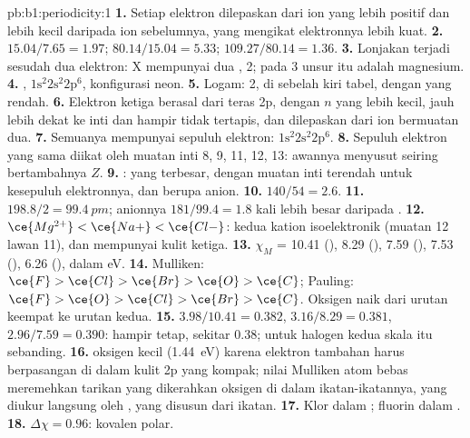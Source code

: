 \begin{solution}{pb:b1:periodicity:1}
\textbf{1.} Setiap elektron dilepaskan dari ion yang lebih positif dan
lebih kecil daripada ion sebelumnya, yang mengikat elektronnya lebih kuat.
\textbf{2.} $15.04/7.65 = 1.97$; $80.14/15.04 = 5.33$; $109.27/80.14 = 1.36$.
\textbf{3.} Lonjakan terjadi sesudah dua elektron: X mempunyai dua
,  2; pada  3 unsur itu adalah magnesium.
\textbf{4.} , $1\text{s}^2 2\text{s}^2 2\text{p}^6$,
konfigurasi neon.
\textbf{5.} Logam:  2, di sebelah kiri tabel, dengan  yang rendah.
\textbf{6.} Elektron ketiga berasal dari teras 2p, dengan $n$ yang lebih
kecil, jauh lebih dekat ke inti dan hampir tidak tertapis, dan dilepaskan
dari ion bermuatan dua.
\textbf{7.} Semuanya mempunyai sepuluh elektron: $1\text{s}^2 2\text{s}^2 2\text{p}^6$.
\textbf{8.} Sepuluh elektron yang sama diikat oleh muatan inti 8, 9, 11,
12, 13: awannya menyusut seiring bertambahnya $Z$.
\textbf{9.} : yang terbesar, dengan muatan inti terendah untuk
kesepuluh elektronnya, dan berupa anion.
\textbf{10.} $140/54 = 2.6$.
\textbf{11.} $198.8/2 = \qty{99.4}{pm}$; anionnya $181/99.4 = 1.8$ kali
lebih besar daripada .
\textbf{12.} $\ce{Mg^{2+}} < \ce{Na+} < \ce{Cl-}$: kedua kation
isoelektronik (muatan 12 lawan 11), dan  mempunyai kulit ketiga.
\textbf{13.} $\chi_M$ = 10.41 (), 8.29 (), 7.59 (),
7.53 (), 6.26 (), dalam eV.
\textbf{14.} Mulliken: $\ce{F} > \ce{Cl} > \ce{Br} > \ce{O} > \ce{C}$;
Pauling: $\ce{F} > \ce{O} > \ce{Cl} > \ce{Br} > \ce{C}$. Oksigen naik
dari urutan keempat ke urutan kedua.
\textbf{15.} $3.98/10.41 = 0.382$, $3.16/8.29 = 0.381$, $2.96/7.59 =
0.390$: hampir tetap, sekitar 0.38; untuk halogen kedua skala itu
sebanding.
\textbf{16.}  oksigen kecil (\qty{1.44}{eV}) karena
elektron tambahan harus berpasangan di dalam kulit 2p yang kompak; nilai
Mulliken atom bebas meremehkan tarikan yang dikerahkan oksigen di dalam
ikatan-ikatannya, yang diukur langsung oleh , yang disusun
dari ikatan.
\textbf{17.} Klor dalam ; fluorin dalam .
\textbf{18.} $\Delta\chi = 0.96$: kovalen polar.

\end{solution}
